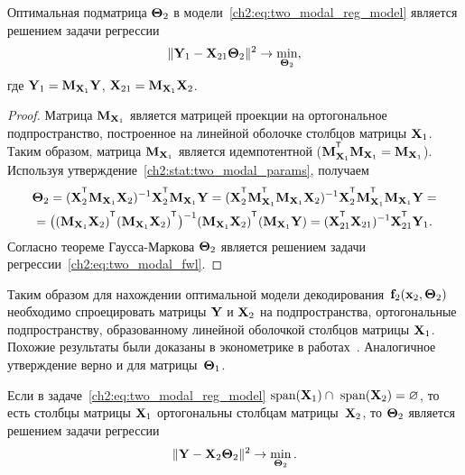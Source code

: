 \begin{statement}
	\label{ch2:stat:two_modal_theta2}
	Оптимальная подматрица $\boldsymbol{\Theta}_2$ в модели~\eqref{ch2:eq:two_modal_reg_model} является решением задачи регрессии
	\begin{equation}
		\| \mathbf{Y}_1 -  \mathbf{X}_{21} \boldsymbol{\Theta}_2 \|^2 \rightarrow \min_{\boldsymbol{\Theta}_2},
		\label{ch2:eq:two_modal_fwl}
	\end{equation}
	где $\mathbf{Y}_1 = \mathbf{M}_{\mathbf{X}_1} \mathbf{Y}$, $\mathbf{X}_{21} = \mathbf{M}_{\mathbf{X}_1} \mathbf{X}_2$.
\end{statement}

\begin{proof}
	Матрица $\mathbf{M}_{\mathbf{X}_1}$ является матрицей проекции на ортогональное подпространство, построенное на линейной оболочке столбцов матрицы $\mathbf{X}_1$. Таким образом, матрица $\mathbf{M}_{\mathbf{X}_1}$ является идемпотентной ($\bM_{\bX_1}^{\T} \bM_{\bX_1} = \bM_{\bX_1}$). 
	Используя утверждение~\ref{ch2:stat:two_modal_params}, получаем
	\begin{multline*}
		\bTheta_2 = (\bX_2^{\T} \bM_{\bX_1} \bX_2)^{-1} \bX_2^{\T} \bM_{\bX_1} \bY = (\bX_2^{\T} \bM_{\bX_1}^{\T} \bM_{\bX_1} \bX_2)^{-1} \bX_2^{\T} \bM_{\bX_1}^{\T} \bM_{\bX_1} \bY = \\
		= \bigl((\bM_{\bX_1} \bX_2)^{\T} (\bM_{\bX_1} \bX_2)^{\T}\bigr)^{-1} (\bM_{\bX_1} \bX_2)^{\T} (\bM_{\bX_1} \bY) = (\bX_{21}^{\T} \bX_{21})^{-1} \bX_{21}^{\T} \bY_1.
	\end{multline*}
	Согласно теореме Гаусса-Маркова $\boldsymbol{\Theta}_2$ является решением задачи регрессии~\eqref{ch2:eq:two_modal_fwl}.
\end{proof}

Таким образом для нахождении оптимальной модели декодирования~$\mathbf{f}_2(\mathbf{x}_2, \boldsymbol{\Theta}_2)$ необходимо спроецировать матрицы $\mathbf{Y}$ и $\mathbf{X}_2$ на подпространства, ортогональные подпространству, образованному линейной оболочкой столбцов матрицы $\mathbf{X}_1$.
Похожие результаты были доказаны в эконометрике в работах~\cite{frisch1933partial,lovell1963seasonal,cinelli2020making}. 
Аналогичное утверждение верно и для матрицы~$\boldsymbol{\Theta}_1$. 

\begin{statement}
	Если в задаче~\eqref{ch2:eq:two_modal_reg_model} $\text{span}(\mathbf{X}_1) \cap \text{ span}(\mathbf{X}_2) = \varnothing$, то есть столбцы матрицы $\mathbf{X}_1$ ортогональны столбцам матрицы~$\mathbf{X}_2$, то $\boldsymbol{\Theta}_2$ является решением задачи регрессии
	\[
		\| \mathbf{Y} -  \mathbf{X}_{2} \boldsymbol{\Theta}_2 \|^2 \rightarrow \min_{\boldsymbol{\Theta}_2}.
	\]
\end{statement}

